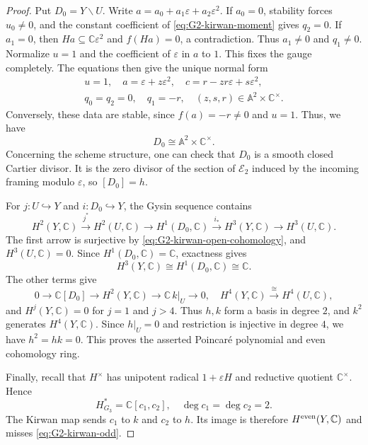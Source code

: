\documentclass[11pt,reqno]{amsart}
\theoremstyle{definition}
\theoremstyle{remark}
\def\bbC{\mathbb C}
\begin{document}
\begin{proof}
Put $D_0=Y\smallsetminus U$. Write
$a=a_0+a_1\varepsilon+a_2\varepsilon^2$.
If $a_0=0$, stability forces $u_0\ne0$, and the constant
coefficient of \eqref{eq:G2-kirwan-moment} gives $q_2=0$.
If $a_1=0$, then $Ha\subseteq\bbC\varepsilon^2$ and $f(Ha)=0$,
a contradiction. Thus $a_1\ne0$ and $q_1\ne0$.
Normalize $u=1$ and the coefficient of $\varepsilon$ in $a$ to $1$.
This fixes the gauge completely. The equations then give the
unique normal form
\begin{equation}\label{eq:G2-kirwan-boundary}
 \begin{gathered}
 u=1,\quad a=\varepsilon+z\varepsilon^2,\quad
 c=r-zr\varepsilon+s\varepsilon^2,\\
 q_0=q_2=0,\quad q_1=-r,\quad
 (z,s,r)\in\mathbb A^2\times\bbC^\times.
 \end{gathered}
\end{equation}
Conversely, these data are stable, since $f(a)=-r\ne0$ and
$u=1$. Thus, we have
\[
 D_0\cong\mathbb A^2\times\bbC^\times.
\]
Concerning the scheme structure, one can check that $D_0$ is a smooth closed Cartier divisor.
It is the zero divisor of the section of $\mathcal E_2$ induced
by the incoming framing modulo $\varepsilon$, so $[D_0]=h$.


For $j:U\hookrightarrow Y$ and $i:D_0\hookrightarrow Y$,
the Gysin sequence contains
\[
 H^2(Y,\bbC)\xrightarrow{j^*}H^2(U,\bbC)
 \longrightarrow H^1(D_0,\bbC)
 \xrightarrow{i_*}H^3(Y,\bbC)\longrightarrow H^3(U,\bbC).
\]
The first arrow is surjective by
\eqref{eq:G2-kirwan-open-cohomology}, and $H^3(U,\bbC)=0$.
Since $H^1(D_0,\bbC)=\bbC$, exactness gives
\begin{equation}\label{eq:G2-kirwan-odd}
 H^3(Y,\bbC)\cong H^1(D_0,\bbC)\cong\bbC.
\end{equation}
The other terms give
\[
 0\longrightarrow\bbC[D_0]\longrightarrow H^2(Y,\bbC)
 \longrightarrow\bbC\,k|_U\longrightarrow0,
 \quad H^4(Y,\bbC)\xrightarrow{\cong}H^4(U,\bbC),
\]
and $H^j(Y,\bbC)=0$ for $j=1$ and $j>4$.
Thus $h,k$ form a basis in degree $2$, and $k^2$ generates
$H^4(Y,\bbC)$. Since $h|_U=0$ and restriction is injective in
degree $4$, we have $h^2=hk=0$. This proves the asserted
Poincar\'e polynomial and even cohomology ring.

Finally, recall that $H^\times$ has unipotent radical $1+\varepsilon H$
and reductive quotient $\bbC^\times$. Hence
\[
 H^*_{G_3}=\bbC[c_1,c_2],\quad \deg c_1=\deg c_2=2.
\]
The Kirwan map sends $c_1$ to $k$ and $c_2$ to $h$.
Its image is therefore $H^{\rm even}(Y,\bbC)$ and misses
\eqref{eq:G2-kirwan-odd}.
\end{proof}
\end{document}
